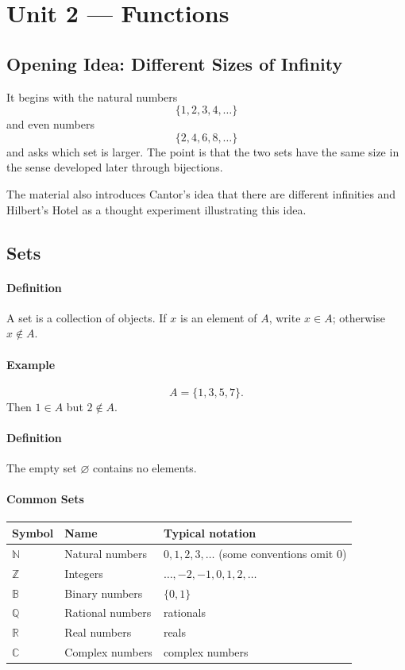 \documentclass[12pt]{article}
\newcommand{\Definition}{\paragraph{Definition}}
\newcommand{\Example}{\paragraph{Example}}
\begin{document}
\newpage
\section{Unit 2 --- Functions}

\subsection{Opening Idea: Different Sizes of Infinity}
It begins with the natural numbers
\[
\{1,2,3,4,\ldots\}
\]
and even numbers
\[
\{2,4,6,8,\ldots\}
\]
and asks which set is larger. The point is that the two sets have the same size in the sense developed later through bijections.

The material also introduces Cantor's idea that there are different infinities and Hilbert's Hotel as a thought experiment illustrating this idea.

\subsection{Sets}

\Definition A set is a collection of objects. If $x$ is an element of $A$, write $x\in A$; otherwise $x\notin A$.

\Example
\[
A=\{1,3,5,7\}.
\]
Then $1\in A$ but $2\notin A$.

\Definition The empty set $\varnothing$ contains no elements.

\paragraph{Common Sets}
\begin{table}[H]
\centering
\begin{tabularx}{\textwidth}{llX}
\toprule
Symbol & Name & Typical notation\\
\midrule
$\mathbb N$ & Natural numbers & $0,1,2,3,\ldots$ (some conventions omit 0)\\
$\mathbb Z$ & Integers & $\ldots,-2,-1,0,1,2,\ldots$\\
$\mathbb B$ & Binary numbers & $\{0,1\}$\\
$\mathbb Q$ & Rational numbers & rationals\\
$\mathbb R$ & Real numbers & reals\\
$\mathbb C$ & Complex numbers & complex numbers\\
\bottomrule
\end{tabularx}
\end{table}
\end{document}
